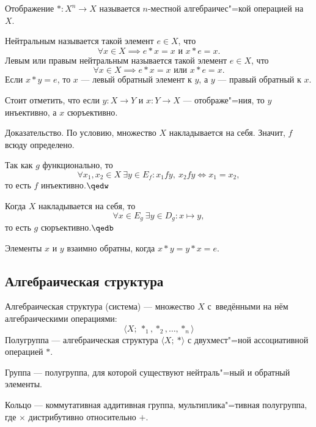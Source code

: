 Отображение $\ast\colon X^n\to X$ называется $n$-местной {\ital алгебраичес"=кой 
операцией} на $X$.\par

{\ital Нейтральным} называется такой элемент $e\in X$, что
$$\forall x\in X\implies e\ast x=x\text{ и }x\ast e=x.$$
{\bold Левым} или {\bold правым} {\ital нейтральным} называется такой элемент
$e\in X$, что
$$\forall x\in X\implies e\ast x=x\text{ или }x\ast e=x.$$
Если $x\ast y=e$, то $x$ --- {\bold левый} {\ital обратный} элемент к $y$, а $y$ ---
{\bold правый} {\ital обратный} к $x$.\par

Стоит отметить, что если $y\colon X\to Y$ и $x\colon Y\to X$ --- отображе"=ния, то $y$ 
{\ital инъективно}, а $x$ {\ital сюръективно}.\par

{\bold Доказательство.} По условию, множество $X$ накладывается на себя.
Значит, $f$ {\ital всюду определено}.\par

Так как $g$ функционально, то
$$\forall x_1,x_2\in X\ \exists y\in E_f\colon x_1fy,\ x_2fy\iff x_1=x_2,$$
то есть $f$ {\ital инъективно}.$\qedw$\par

Когда $X$ накладывается на себя, то
$$\forall x\in E_g\ \exists y\in D_g\colon x\mapsto y,$$
то есть $g$ {\ital сюръективно}.$\qedb$

Элементы $x$ и $y$ {\bold взаимно} {\ital обратны}, когда $x\ast y=y\ast x=e$.

\newpage
\subsection{Алгебраическая структура}

{\bold Алгебраическая структура} {\ital (система)} --- множество $X$ с~введёнными на нём 
алгебраическими операциями:
$$\langle X;\ \ast_1,\ast_2,\dots,\ast_n\rangle$$
{\ital Полугруппа} --- алгебраическая структура $\langle X;\ \ast\rangle$ с двухмест"=ной 
ассоциативной операцией $\ast$.

{\ital Группа} --- полугруппа, для которой существуют нейтраль"=ный и обратный элементы.
\par

{\ital Кольцо} --- коммутативная аддитивная группа, мультиплика"=тивная полугруппа, где
$\times$ дистрибутивно относительно $+$.\par

